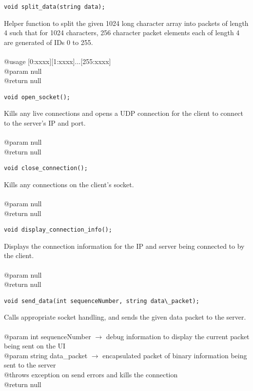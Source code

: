 \documentclass[12pt]{article}
\begin{document}
\begin{lstlisting}
void split_data(string data);
\end{lstlisting}
Helper function to split the given 1024 long character array into packets of length 4 such that for 1024 characters, 256 character packet elements each of length 4 are generated of IDs 0 to 255.\\\\
@usage [0:xxxx][1:xxxx]...[255:xxxx]\\
@param null\\
@return null

\begin{lstlisting}
void open_socket();
\end{lstlisting}
Kills any live connections and opens a UDP connection for the client to connect to the server's IP and port.\\\\
@param null\\
@return null

\begin{lstlisting}
void close_connection();
\end{lstlisting}
Kills any connections on the client's socket.\\\\
@param null\\
@return null

\begin{lstlisting}
void display_connection_info();
\end{lstlisting}
Displays the connection information for the IP and server being connected to by the client.\\\\
@param null\\
@return null

\begin{lstlisting}
void send_data(int sequenceNumber, string data\_packet);
\end{lstlisting}
Calls appropriate socket handling, and sends the given data packet to the server.\\\\
@param int sequenceNumber $\rightarrow$ debug information to display the current packet being sent on the UI\\
@param string data\_packet $\rightarrow$ encapsulated packet of binary information being sent to the server\\
@throws exception on send errors and kills the connection\\
@return null
\end{document}
